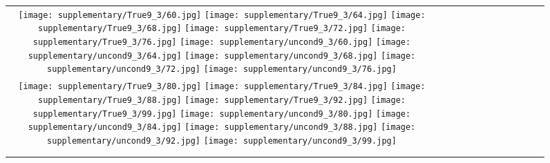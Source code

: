 \begin{figure*}[tb!]
{\begin{tabular}{c c c c c c c c c c c c }
\tabularnewline
  \texttt{[image: supplementary/True9\_3/60.jpg]}
  \texttt{[image: supplementary/True9\_3/64.jpg]}
  \texttt{[image: supplementary/True9\_3/68.jpg]}
  \texttt{[image: supplementary/True9\_3/72.jpg]}
  \texttt{[image: supplementary/True9\_3/76.jpg]}
  \hspace{5mm}
  \texttt{[image: supplementary/uncond9\_3/60.jpg]}
  \texttt{[image: supplementary/uncond9\_3/64.jpg]}
  \texttt{[image: supplementary/uncond9\_3/68.jpg]}
  \texttt{[image: supplementary/uncond9\_3/72.jpg]}
  \texttt{[image: supplementary/uncond9\_3/76.jpg]}

\tabularnewline
  \texttt{[image: supplementary/True9\_3/80.jpg]}
  \texttt{[image: supplementary/True9\_3/84.jpg]}
  \texttt{[image: supplementary/True9\_3/88.jpg]}
  \texttt{[image: supplementary/True9\_3/92.jpg]}
  \texttt{[image: supplementary/True9\_3/99.jpg]}
  \hspace{5mm}
  \texttt{[image: supplementary/uncond9\_3/80.jpg]}
  \texttt{[image: supplementary/uncond9\_3/84.jpg]}
  \texttt{[image: supplementary/uncond9\_3/88.jpg]}
  \texttt{[image: supplementary/uncond9\_3/92.jpg]}
  \texttt{[image: supplementary/uncond9\_3/99.jpg]}
    \tabularnewline

 \hspace{0.5mm}
  \tabularnewline
\vspace{2mm}
\vspace{-2\baselineskip}
\end{tabular}}
\vspace{-0.8cm}
\hspace{20pt}
\label{fig:sup11}
\vspace{-8mm}
\end{figure*}%